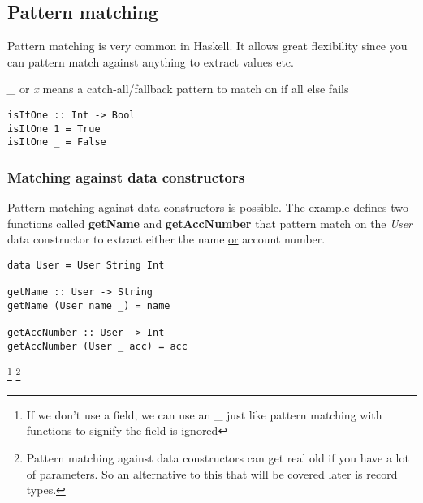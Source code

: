 \subsection{Pattern matching}
Pattern matching is very common in Haskell. It allows great flexibility since you can pattern match against anything to extract values etc.

\emph{\_} or \emph{x} means a catch-all/fallback pattern to match on if all else fails

\begin{lstlisting}
isItOne :: Int -> Bool
isItOne 1 = True
isItOne _ = False
\end{lstlisting}

\subsubsection{Matching against data constructors}
Pattern matching against data constructors is possible. The example defines two functions called \textbf{getName} and \textbf{getAccNumber} that
pattern match on the \emph{User} data constructor to extract either the name \underline{or} account number.

\begin{lstlisting}
data User = User String Int

getName :: User -> String
getName (User name _) = name

getAccNumber :: User -> Int
getAccNumber (User _ acc) = acc
\end{lstlisting}

\footnote{If we don't use a field, we can use an \_ just like pattern matching with functions to signify the field is ignored}
\footnote{
    Pattern matching against data constructors can get real old if you have a lot of parameters.
    So an alternative to this that will be covered later is record types.
}